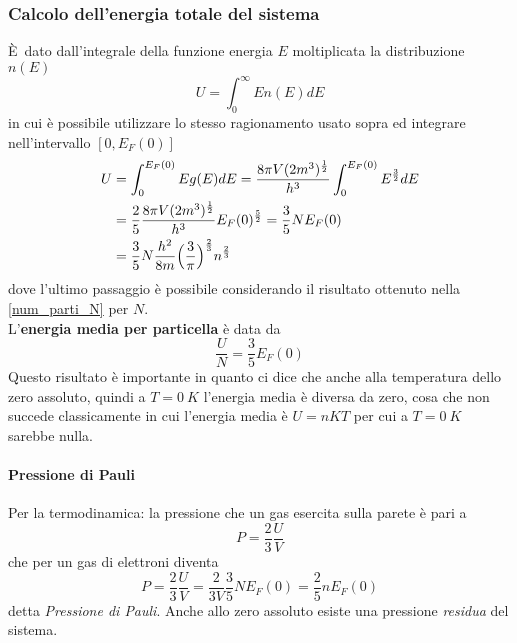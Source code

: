 \subsubsection{Calcolo dell'energia totale del sistema}
È dato dall'integrale della funzione energia $E$ moltiplicata la distribuzione $n(E)$
\begin{equation}
U = \int_0^{\infty} E n(E) dE
\end{equation}
in cui è possibile utilizzare lo stesso ragionamento usato sopra ed integrare nell'intervallo $[0,E_F(0)]$
\begin{equation}
\begin{split}
U & = \int_0^{E_F(0)} E g(E) dE = \frac{8\pi V (2m^3)^{ \frac{1}{2} }}{h^3} \int_0^{E_F(0)} E^{ \frac{3}{2} } dE \\
& = \frac{2}{5} \frac{8\pi V (2m^3)^{ \frac{1}{2} }}{h^3} E_F(0)^{ \frac{5}{2} } = \frac{3}{5} N E_F(0) \\
& = \frac{3}{5} N \frac{h^2}{8m}\Bigl(  \frac{3}{\pi}  \Bigr)^{ \frac{2}{3} } n^{ \frac{2}{3} }
\end{split}
\end{equation}
dove l'ultimo passaggio è possibile considerando il risultato ottenuto nella \ref{num_parti_N} per $N$. \\
L'\textbf{energia media per particella} è data da
\begin{equation}
\frac{U}{N} = \frac{3}{5} E_F(0)
\end{equation}
Questo risultato è importante in quanto ci dice che anche alla temperatura dello zero assoluto, quindi a $T = \SI{0}{K}$ l'energia media è diversa da zero, cosa che non succede classicamente in cui l'energia media è $U = n K T$ per cui a $T=\SI{0}{K}$ sarebbe nulla.

\paragraph{Pressione di Pauli} Per la termodinamica: la pressione che un gas esercita sulla parete è pari a
\begin{equation}
P = \frac{2}{3} \frac{U}{V}
\end{equation}
che per un gas di elettroni diventa
\begin{equation}
P = \frac{2}{3} \frac{U}{V} = \frac{2}{3V} \frac{3}{5} N E_F(0) = \frac{2}{5} n E_F(0) 
\end{equation}
detta \textit{Pressione di Pauli}.
Anche allo zero assoluto esiste una pressione \textit{residua} del sistema.

